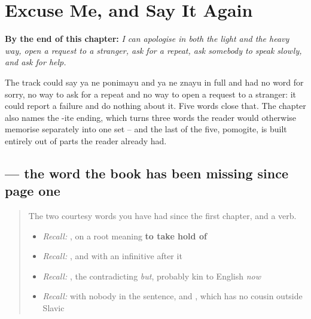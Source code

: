 
\chapter{Excuse Me, and Say It Again}
\label{ch:ru-repair}

\begin{chapteropening}
\textbf{By the end of this chapter:} \emph{I can apologise in both the light and the heavy way, open a request to a stranger, ask for a repeat, ask somebody to speak slowly, and ask for help.}

The track could say ya ne ponimayu and ya ne znayu in full and had no word for sorry, no way to ask for a repeat and no way to open a request to a stranger: it could report a failure and do nothing about it. Five words close that. The chapter also names the -ite ending, which turns three words the reader would otherwise memorise separately into one set -- and the last of the five, pomogite, is built entirely out of parts the reader already had.
\end{chapteropening}

\section[\texorpdfstring{\ru{извините} (izvinítye)}{извините (izvinítye)}]{ — the word the book has been missing since page one}

\label{lesson:RU-C21-izvinite}



\begin{quote}
The two courtesy words you have had since the first chapter, and a verb.

\begin{itemize}
\raggedright
  \item \emph{Recall:} \emph{}, on a root meaning \textbf{to take hold of}
  \item \emph{Recall:} \emph{}, and \emph{} with an infinitive after it
  \item \emph{Recall:} \emph{}, the contradicting \emph{but}, probably kin to English \emph{now}
  \item \emph{Recall:} \emph{} with nobody in the sentence, and \emph{}, which has no cousin outside Slavic
\end{itemize}
\end{quote}

